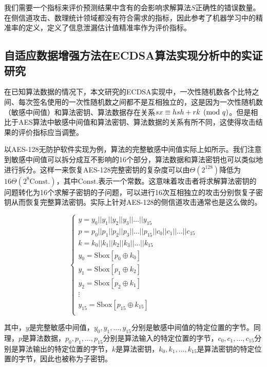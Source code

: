 {	我们需要一个指标来评价预测结果中含有的会影响求解算法$S$正确性的错误数量。在侧信道攻击、数理统计领域都没有符合需求的指标，因此参考了机器学习中的精准率的定义，定义了信息泄漏估计值精准率作为评价指标。%
	\subsection{自适应数据增强方法在ECDSA算法实现分析中的实证研究}

	\expsettings

	在已知算法数据的情况下，本文研究的ECDSA实现中，一次性随机数各个比特之间、每次签名使用的一次性随机数之间都不是互相独立的，这是因为一次性随机数（敏感中间值）和算法密钥、算法数据存在关系$sx\equiv hsh+rk\pmod q$。但是相比于AES算法中敏感中间值和算法密钥、算法数据的关系有所不同，这使得攻击结果的评价指标应当调整。
	
	以AES-128无防护软件实现为例，算法的完整敏感中间值实际上如所示。我们注意到敏感中间值可以拆分成互不影响的16个部分，算法数据和算法密钥也可以类似地进行拆分。这样一来恢复AES-128完整密钥的复杂度可以由$\Theta(2^{128})$降低为$16\Theta(2^8\mathrm{Const.})$，其中$\mathrm{Const.}$表示一个常数。这意味着攻击者将求解算法密钥的问题转化为16个求解子密钥的子问题，可以进行16次互相独立的攻击分别恢复子密钥从而恢复完整算法密钥。实际上针对AES-128的侧信道攻击通常也是这么做的。
	
	\begin{equation}
		\begin{cases}
			y=y_0||y_1||y_2||y_3||\dots||y_{15}\\
			p=p_0||p_1||p_2||p_3||\dots||p_{15}||c_{0}||c_1||\dots||c_{15}\\
			k=k_0||k_1||k_2||k_3||\dots||k_{15}\\
			y_0=\mathrm{Sbox}[p_0\oplus k_0]\\
			y_1=\mathrm{Sbox}[p_1\oplus k_2]\\
			y_2=\mathrm{Sbox}[p_2\oplus k_1]\\
			\vdots\\
			y_{15}=\mathrm{Sbox}[p_{15}\oplus k_{15}]\\
		\end{cases}\label{eq:fullimtermidiate}
	\end{equation}

	\noindent 其中，$y$是完整敏感中间值，$y_0,y_1,\dots,y_{15}$分别是敏感中间值的特定位置的字节。同理，$p$是算法数据，$p_0,p_1,\dots,p_{15}$分别是算法输入的特定位置的字节，$c_0,c_1,\dots,c_{15}$分别是算法输出的特定位置的字节，$k$是算法密钥，$k_0,k_1,\dots,k_{15}$是算法密钥的特定位置的字节，因此也被称为子密钥。
	
}
